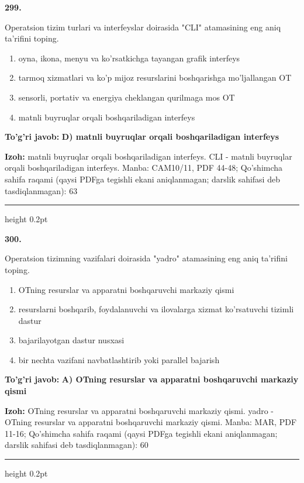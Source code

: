 \documentclass[10pt,a4paper]{article}
\begin{document}
{\bfseries\sffamily\color{ink} 299.}
\par
Operatsion tizim turlari va interfeyslar doirasida "CLI" atamasining eng aniq ta'rifini toping.
\begin{enumerate}[label=\Alph*),leftmargin=9mm]
\item oyna, ikona, menyu va ko'rsatkichga tayangan grafik interfeys
\item tarmoq xizmatlari va ko'p mijoz resurslarini boshqarishga mo'ljallangan OT
\item sensorli, portativ va energiya cheklangan qurilmaga mos OT
\item matnli buyruqlar orqali boshqariladigan interfeys
\end{enumerate}
\begin{tcolorbox}[enhanced,breakable,colback=teal!4,colframe=teal!60!black,boxrule=0.45pt,arc=1.2mm,left=2.7mm,right=2.7mm,top=1.8mm,bottom=1.8mm,before skip=2mm,after skip=2mm]
{\bfseries\sffamily\color{teal}To'g'ri javob:} \textbf{D) matnli buyruqlar orqali boshqariladigan interfeys}
\par\smallskip
{\bfseries Izoh:} matnli buyruqlar orqali boshqariladigan interfeys. CLI - matnli buyruqlar orqali boshqariladigan interfeys. Manba: CAM10/11, PDF 44-48; Qo'shimcha sahifa raqami (qaysi PDFga tegishli ekani aniqlanmagan; darslik sahifasi deb tasdiqlanmagan): 63
\end{tcolorbox}
\vspace{2mm}\hrule height 0.2pt\vspace{3mm}

{\bfseries\sffamily\color{ink} 300.}
\par
Operatsion tizimning vazifalari doirasida "yadro" atamasining eng aniq ta'rifini toping.
\begin{enumerate}[label=\Alph*),leftmargin=9mm]
\item OTning resurslar va apparatni boshqaruvchi markaziy qismi
\item resurslarni boshqarib, foydalanuvchi va ilovalarga xizmat ko'rsatuvchi tizimli dastur
\item bajarilayotgan dastur nusxasi
\item bir nechta vazifani navbatlashtirib yoki parallel bajarish
\end{enumerate}
\begin{tcolorbox}[enhanced,breakable,colback=teal!4,colframe=teal!60!black,boxrule=0.45pt,arc=1.2mm,left=2.7mm,right=2.7mm,top=1.8mm,bottom=1.8mm,before skip=2mm,after skip=2mm]
{\bfseries\sffamily\color{teal}To'g'ri javob:} \textbf{A) OTning resurslar va apparatni boshqaruvchi markaziy qismi}
\par\smallskip
{\bfseries Izoh:} OTning resurslar va apparatni boshqaruvchi markaziy qismi. yadro - OTning resurslar va apparatni boshqaruvchi markaziy qismi. Manba: MAR, PDF 11-16; Qo'shimcha sahifa raqami (qaysi PDFga tegishli ekani aniqlanmagan; darslik sahifasi deb tasdiqlanmagan): 60
\end{tcolorbox}
\vspace{2mm}\hrule height 0.2pt\vspace{3mm}
\end{document}
